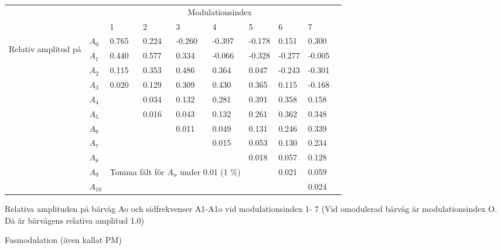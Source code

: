 \documentclass[a4paper,twoside,twocolumn,openright]{book}
\begin{document}
\begin{table*}[h]
\begin{center}
\begin{tabular}{l|l|l|l|l|l|l|l|l|l|}
\cline{3-9}
&\multicolumn{1}{l}{}  & \multicolumn{7}{|c|}{Modulationsindex} \\ \cline{3-9}
&\multicolumn{1}{l|}{}  &   1   &   2   &    3   &    4   &    5   &    6   &    7   \\ \hline
\multirow{11}{}{\begin{rotate}{90}Relativ amplitud på\end{rotate}}&$A_0$ & 0.765 & 0.224 & -0.260 & -0.397 & -0.178 &  0.151 &  0.300 \\
&$A_1$ & 0.440 & 0.577 &  0.334 & -0.066 & -0.328 & -0.277 & -0.005 \\
&$A_2$ & 0.115 & 0.353 &  0.486 &  0.364 &  0.047 & -0.243 & -0.301 \\
&$A_3$ & 0.020 & 0.129 &  0.309 &  0.430 &  0.365 &  0.115 & -0.168 \\
&$A_4$ &       & 0.034 &  0.132 &  0.281 &  0.391 &  0.358 &  0.158 \\
&$A_5$ &       & 0.016 &  0.043 &  0.132 &  0.261 &  0.362 &  0.348 \\
&$A_6$ & \multicolumn{2}{c|}{} &  0.011 &  0.049 &  0.131 &  0.246 &  0.339 \\
&$A_7$ & \multicolumn{3}{c|}{} &  0.015 &  0.053 &  0.130 &  0.234 \\
&$A_8$ & \multicolumn{4}{c|}{}           &  0.018 &  0.057 &  0.128 \\
&$A_9$ & \multicolumn{4}{c}{Tomma fält för $A_n$ under 0.01 (1 \%)} &        &  0.021 &  0.059 \\
&$A_{10}$ & \multicolumn{5}{c}{} &  &  0.024 \\ \hline
\end{tabular}
\end{center}
\end{table*}

Relativa amplituden på bärvåg Ao och sidfrekvenser A1-A1o vid modulationsindex 1- 7
(Vid omodulerad bärvåg är modulationsindex O. Då är bärvågens relativa amplitud 1.0)

Fasmodulation (även kallat PM)
\end{document}
